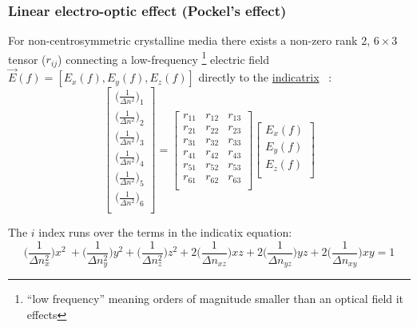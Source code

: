 \subsubsection{Linear electro-optic effect (Pockel's effect)}
For non-centrosymmetric crystalline media there exists a non-zero rank 2, $6 \times 3$ tensor ($r_{ij}$) connecting a low-frequency \footnote{``low frequency'' meaning orders of magnitude smaller than an optical field it effects} electric field $\vec{E}(f) = [E_x(f), E_y(f), E_z(f)]$ directly to the \hyperref[sec:indicatrix]{indicatrix} ~\cite{yariv,nye}:
\begin{equation}
  \left[ {\begin{array}{c}
   \big( \frac{1}{\Delta n ^2 } \big)_1 \\
   \big( \frac{1}{\Delta n ^2 } \big)_2 \\
   \big( \frac{1}{\Delta n ^2 } \big)_3 \\
   \big( \frac{1}{\Delta n ^2 } \big)_4 \\
   \big( \frac{1}{\Delta n ^2 } \big)_5 \\
   \big( \frac{1}{\Delta n ^2 } \big)_6 \\
  \end{array} } \right]
  =
%
 \left[ {\begin{array}{ccc}
   r_{11} & r_{12} & r_{13}\\
   r_{21} & r_{22} & r_{23}\\
   r_{31} & r_{32} & r_{33}\\
   r_{41} & r_{42} & r_{43}\\
   r_{51} & r_{52} & r_{53}\\
   r_{61} & r_{62} & r_{63}\\
  \end{array}} \right]
 \left[{\begin{array}{c}
   E_x (f)\\
   E_y (f)\\
   E_z (f)\\
 \end{array}} \right]
\end{equation}

\noindent The $i$ index runs over the terms in the indicatix equation:
\begin{equation}
\bigg(\frac{1}{\Delta n_x^2} \bigg) x^2\ + \bigg(\frac{1}{\Delta n_y^2} \bigg) y^2 + \bigg(\frac{1}{\Delta n_z^2} \bigg) z^2 + 2 \bigg(\frac{1}{\Delta n_{xz}} \bigg)xz + 2 \bigg(\frac{1}{\Delta n_{yz}} \bigg)yz + 2 \bigg(\frac{1}{\Delta n_{xy}} \bigg)xy = 1
\end{equation}

